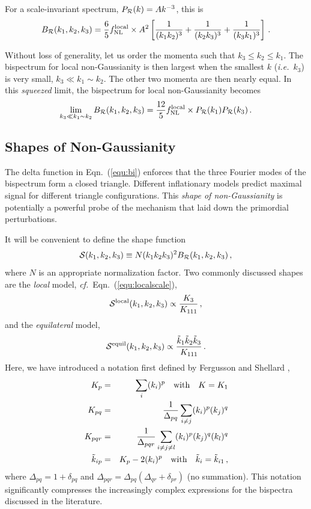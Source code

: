 \documentclass[12pt,letterpaper,rotate]{article}
\def\beq{\begin{equation}}
\def\eeq{\end{equation}}
\def\bea{\begin{eqnarray}}
\def\eea{\end{eqnarray}}
\def\R{{\cal R}}
\begin{document}
{For a scale-invariant spectrum, $P_\R(k) = A k^{-3}$, this is
\beq
\label{equ:localscale}
B_\R(k_1, k_2, k_3) = \frac{6}{5} f_{\rm NL}^{\rm local} \times A^2 \left[ \frac{1}{(k_1 k_2)^3}+ \frac{1}{(k_2 k_3)^3}+  \frac{1}{(k_3 k_1)^3}\right]\, .
\eeq

Without loss of generality, let us order the momenta such that $k_3 \le k_2 \le k_1$.
The bispectrum for local non-Gaussianity is then largest when the smallest $k$ ({\it i.e.}~$k_3$) is very small, $k_3 \ll k_1 \sim k_2$.
The other two momenta are then nearly equal.
In this {\it squeezed} limit, the bispectrum for local non-Gaussianity becomes
\beq
\lim_{k_3 \ll k_1 \sim k_2} B_\R(k_1, k_2, k_3) = \frac{12}{5} f_{\rm NL}^{\rm local} \times P_\R(k_1) P_\R(k_3)\, .
\eeq
\subsection{Shapes of Non-Gaussianity}
The delta function in Eqn.~(\ref{equ:bi}) enforces that
the three Fourier modes of the bispectrum form a closed triangle.
Different inflationary models predict maximal signal for different triangle configurations. This {\it shape of non-Gaussianity} \cite{Babich_etal_04} is potentially a powerful probe of the mechanism that laid down the primordial perturbations.

It will be convenient to define the shape function
\beq
{\cal S}(k_1,k_2, k_3) \equiv N (k_1 k_2 k_3)^2 B_\R(k_1, k_2, k_3)\, ,
\eeq
where $N$ is an appropriate normalization factor.
Two commonly discussed shapes are the {\it local} model, {\it cf.}~Eqn.~(\ref{equ:localscale}),
\beq
{\cal S}^{\rm local}(k_1, k_2, k_3) \propto \frac{K_3}{K_{111}}\, ,
\eeq
and the {\it equilateral} model,
\beq
{\cal S}^{\rm equil}(k_1, k_2, k_3) \propto \frac{\tilde k_1 \tilde k_2 \tilde k_3}{K_{111}}\, .
\eeq
Here, we have introduced a notation first defined by Fergusson and Shellard \cite{Fergusson:2008ra},
\bea
K_p &=& \sum_i (k_i)^p \quad {\rm with} \quad K = K_1 \\
K_{pq} &=& \frac{1}{\Delta_{pq}} \sum_{i \ne j} (k_i)^p (k_j)^q \\
K_{pqr} &=& \frac{1}{\Delta_{pqr}} \sum_{i \ne j \ne l} (k_i)^p (k_j)^q (k_l)^q \\
\tilde k_{ip} &=& K_p - 2 (k_i)^p \quad {\rm with} \quad \tilde k_i = \tilde k_{i1}\, ,
\eea
where $\Delta_{pq} = 1 + \delta_{pq}$ and $\Delta_{pqr} = \Delta_{pq}(\Delta_{qr} + \delta_{pr})$ (no summation). This notation significantly compresses the increasingly complex expressions for the bispectra discussed in the literature.

}
\end{document}
